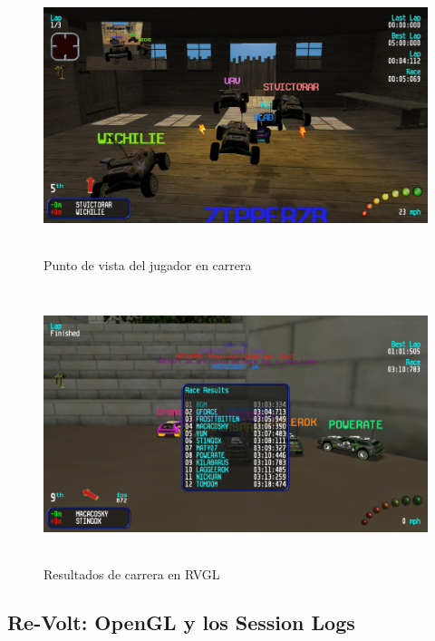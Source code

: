 \begin{figure}[H]
  \begin{center}
    \includegraphics[width=15cm, height=8cm]{img/gameplay.jpg}
  \end{center}
  \caption[Punto de vista del jugador en carrera]{Punto de vista del jugador en carrera}
  \label{fig:gameplay}
\end{figure}

\begin{figure}[H]
  \begin{center}
    \includegraphics[width=15cm, height=8cm]{img/results.png}
  \end{center}
  \caption[Resultados de carrera en RVGL]{Resultados de carrera en RVGL}
  \label{fig:results}
\end{figure}

\subsection{Re-Volt: OpenGL y los Session Logs}

